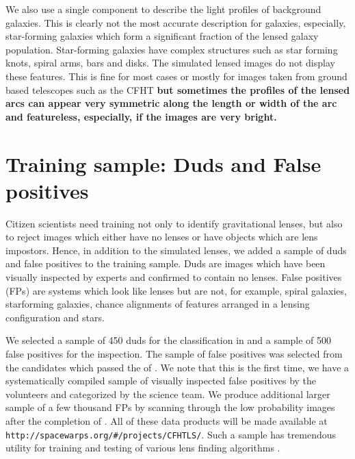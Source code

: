 \documentclass[useAMS,usenatbib,a4paper]{mn2e}
\begin{document}
We also use a single component to describe the light profiles of
background galaxies. This is clearly not the most accurate description for
galaxies, especially, star-forming galaxies which form a significant fraction
of the lensed galaxy population. Star-forming galaxies have complex structures
such as star forming knots, spiral arms, bars and disks. The simulated lensed
images do not display these features. This is fine for most cases or
mostly for images taken from ground based telescopes such as the CFHT
{\bf but sometimes the profiles of the lensed arcs can appear very symmetric along the
length or width of the arc and featureless, especially, if the images
are very bright.}


\section{Training sample: Duds and False positives}
\label{sec:dfp}

Citizen scientists need training not only to identify gravitational
lenses, but also to reject images which either have no lenses or have
objects which are lens impostors. Hence, in addition to the simulated
lenses, we added a sample of duds and false positives to the training
sample. Duds are images which have been visually inspected by experts
and confirmed to contain no lenses. False positives (FPs) are systems
which look like lenses but are not, for example, spiral galaxies,
starforming galaxies, chance alignments of features arranged in a
lensing configuration and stars.

We selected a sample of 450 duds for the \StageOne classification in \sw
and a sample of 500 false positives for the \StageTwo inspection. The
sample of false positives was selected from the candidates which passed
the \StageOne of \sw. We note that this is the first time, we have a
systematically compiled sample of visually inspected false positives by
the \sw volunteers and categorized by the science team. We produce
additional larger sample of a few thousand FPs by scanning through the
low probability images after the completion of \StageTwo. All of these
data products will be made available at
\texttt{http://spacewarps.org/\#/projects/CFHTLS/}. Such a sample has tremendous
utility for training and testing of various lens finding algorithms
\citep[e.g.,][]{Chan2014}.
\end{document}
